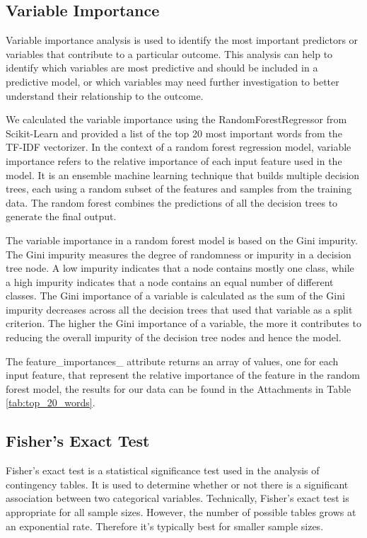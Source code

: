 \subsection{Variable Importance}

Variable importance analysis is used to identify the most important predictors or variables that contribute to a particular outcome. This analysis can help to identify which variables are most predictive and should be included in a predictive model, or which variables may need further investigation to better understand their relationship to the outcome.

We calculated the variable importance using the RandomForestRegressor from Scikit-Learn and provided a list of the top 20 most important words from the TF-IDF vectorizer. In the context of a random forest regression model, variable importance refers to the relative importance of each input feature used in the model. It is an ensemble machine learning technique that builds multiple decision trees, each using a random subset of the features and samples from the training data. The random forest combines the predictions of all the decision trees to generate the final output. 

The variable importance in a random forest model is based on the Gini impurity. The Gini impurity measures the degree of randomness or impurity in a decision tree node. A low impurity indicates that a node contains mostly one class, while a high impurity indicates that a node contains an equal number of different classes. The Gini importance of a variable is calculated as the sum of the Gini impurity decreases across all the decision trees that used that variable as a split criterion. The higher the Gini importance of a variable, the more it contributes to reducing the overall impurity of the decision tree nodes and hence the model. 

The feature\_importances\_ attribute returns an array of values, one for each input feature, that represent the relative importance of the feature in the random forest model, the results for our data can be found in the Attachments in Table \ref{tab:top_20_words}.

\subsection{Fisher's Exact Test}

Fisher's exact test is a statistical significance test used in the analysis of contingency tables. It is used to determine whether or not there is a significant association between two categorical variables. Technically, Fisher's exact test is appropriate for all sample sizes. However, the number of possible tables grows at an exponential rate. Therefore it's typically best for smaller sample sizes.

